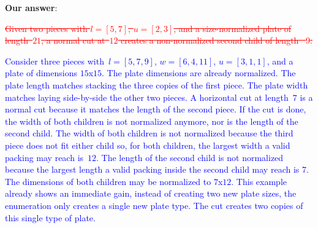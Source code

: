 \documentclass[smallextended]{svjour3}       %
\makeatletter
\newif\iffinalversion
\newcommand{\newtext}[1]{\iffinalversion%
#1%
\else%
\textcolor{blue}{#1}%
\fi%
}
\newcommand{\oldtext}[1]{\iffinalversion%
#1%
\else%
\textcolor{red}{\sout{#1}}%
\fi%
}
\newcommand\gobblepars{%
    \@ifnextchar\par%
        {\expandafter\gobblepars\@gobble}%
        {}}
\newcounter{answer}
\newenvironment{answer}{%
    \refstepcounter{answer}\par\smallskip\noindent%
    \textbf{Our answer}: \gobblepars}%
    {\unskip\bigskip}
\makeatother
\begin{document}
\begin{answer}
\begin{example}\label{ex:renormalization_after_cut}
\oldtext{Given two pieces with \(l = [5, 7]\), \(u = [2, 3]\), and a size-normalized plate of length~\(21\), a normal cut at~\(12\) creates a non-normalized second child of length~ \(9\).}
\newtext{Consider three pieces with~\(l = [5, 7, 9]\), \(w = [6, 4, 11]\), \(u = [3, 1, 1]\), and a plate of dimensions \(15\)x\(15\). The plate dimensions are already normalized. The plate length matches stacking the three copies of the first piece. The plate width matches laying side-by-side the other two pieces. A horizontal cut at length~\(7\) is a normal cut because it matches the length of the second piece. If the cut is done, the width of both children is not normalized anymore, nor is the length of the second child. The width of both children is not normalized because the third piece does not fit either child so, for both children, the largest width a valid packing may reach is~\(12\). The length of the second child is not normalized because the largest length a valid packing inside the second child may reach is 7. The dimensions of both children may be normalized to \(7\)x\(12\). This example already shows an immediate gain, instead of creating two new plate sizes, the enumeration only creates a single new plate type. The cut creates two copies of this single type of plate.}
\end{example}

\begin{figure}[ht]
\center
{}
\end{figure}
\end{answer}
\end{document}
